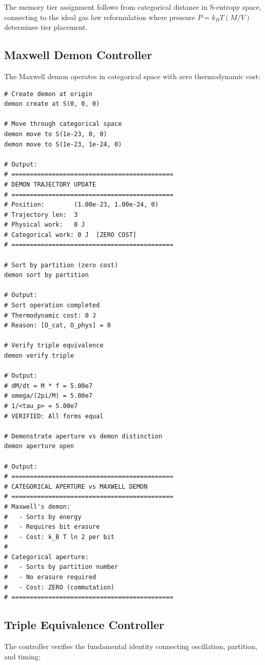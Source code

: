 \documentclass[twocolumn,10pt]{article}
\begin{document}
The memory tier assignment follows from categorical distance in S-entropy space, connecting to the ideal gas law reformulation where pressure $P = k_B T (M/V)$ determines tier placement.

\subsection{Maxwell Demon Controller}

The Maxwell demon operates in categorical space with zero thermodynamic cost:

\begin{lstlisting}[caption={Maxwell demon operations}]
# Create demon at origin
demon create at S(0, 0, 0)

# Move through categorical space
demon move to S(1e-23, 0, 0)
demon move to S(1e-23, 1e-24, 0)

# Output:
# ============================================
# DEMON TRAJECTORY UPDATE
# ============================================
# Position:        (1.00e-23, 1.00e-24, 0)
# Trajectory len:  3
# Physical work:   0 J
# Categorical work: 0 J  [ZERO COST]
# ============================================

# Sort by partition (zero cost)
demon sort by partition

# Output:
# Sort operation completed
# Thermodynamic cost: 0 J
# Reason: [O_cat, O_phys] = 0

# Verify triple equivalence
demon verify triple

# Output:
# dM/dt = M * f = 5.00e7
# omega/(2pi/M) = 5.00e7
# 1/<tau_p> = 5.00e7
# VERIFIED: All forms equal

# Demonstrate aperture vs demon distinction
demon aperture open

# Output:
# ============================================
# CATEGORICAL APERTURE vs MAXWELL DEMON
# ============================================
# Maxwell's demon:
#   - Sorts by energy
#   - Requires bit erasure
#   - Cost: k_B T ln 2 per bit
#
# Categorical aperture:
#   - Sorts by partition number
#   - No erasure required
#   - Cost: ZERO (commutation)
# ============================================
\end{lstlisting}

\subsection{Triple Equivalence Controller}

The controller verifies the fundamental identity connecting oscillation, partition, and timing:
\end{document}
